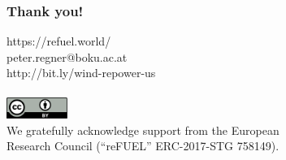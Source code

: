 \documentclass[color=usenames,dvipsnames]{beamer}
\begin{document}
    {
    \begin{frame}[plain]
        \frametitle{Thank you!}
        \vspace{1.5cm}
        https://refuel.world/\\
        peter.regner@boku.ac.at\\
        http://bit.ly/wind-repower-us\\

        \vspace{0.6cm}
        \\

        \vspace{1.95cm}
        \includegraphics[height=0.7cm]{creative-commons-by.pdf}\\
        \smallskip
        \tiny{We gratefully acknowledge support from the European\\
        Research Council (“reFUEL” ERC-2017-STG 758149).}
    \end{frame}
    }
\end{document}
